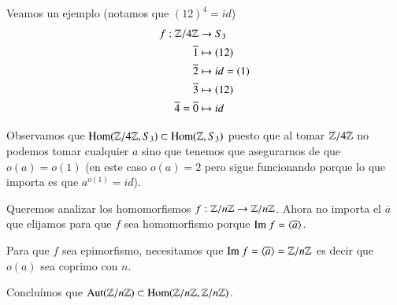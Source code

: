 \begin{ej}
	Veamos un ejemplo (notamos que $(12)^4 = id$)
	\begin{align*}
	f:\mathbb{Z}/4\mathbb{Z} &\to S_3 \\
	\overline{1} &\mapsto (12) \\
	\overline{2} &\mapsto id = (1) \\
	\overline{3} &\mapsto (12) \\
	\overline{4} = \overline{0} &\mapsto id
	\end{align*}
	
	Observamos que $\text{Hom}(\mathbb{Z}/4\mathbb{Z}, S_3) \subset \text{Hom}(\mathbb{Z}, S_3)$ puesto que al tomar $\mathbb{Z}/4\mathbb{Z}$ no podemos tomar cualquier $a$ sino que tenemos que asegurarnos de que $o(a) = o(1)$ (en este caso $o(a) = 2$ pero sigue funcionando porque lo que importa es que $a^{o(1)} = id$).
\end{ej}

Queremos analizar los homomorfismos $f:\mathbb{Z}/n\mathbb{Z} \to \mathbb{Z}/n\mathbb{Z}$. Ahora no importa el $\overline{a}$ que elijamos para que $f$ sea homomorfismo porque $\text{Im } f = \langle \overline{a} \rangle$. 

Para que $f$ sea epimorfismo, necesitamos que $\text{Im } f = \langle \overline{a} \rangle = \mathbb{Z}/n\mathbb{Z}$ es decir que $o(a)$ sea coprimo con $n$.

Concluímos que $\text{Aut}(\mathbb{Z}/n\mathbb{Z}) \subset \text{Hom}(\mathbb{Z}/n\mathbb{Z}, \mathbb{Z}/n\mathbb{Z})$.

